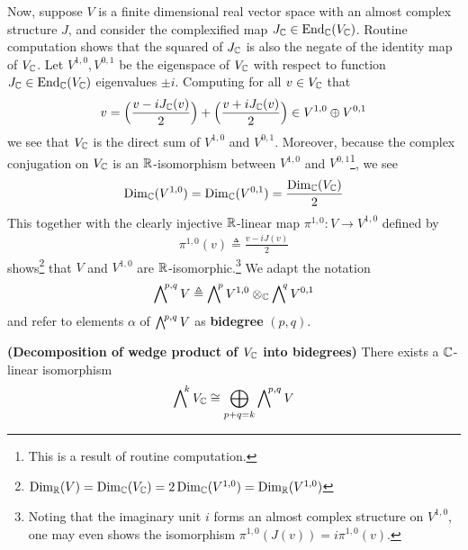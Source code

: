 \documentclass{report}
\begin{document}
Now, suppose $V$ is a finite dimensional real vector space with an almost complex structure  $J$, and consider the complexified map $J_{\mathbb{C}}\in \operatorname{End}_{\mathbb{C}}(V_{\mathbb{C}})$. Routine computation shows that the squared of $J_{\mathbb{C}}$ is also the negate of the identity map of  $V_{\mathbb{C}}$. Let $V^{1,0},V^{0,1}$ be the eigenspace of $V_{\mathbb{C}}$ with respect to function $J_{\mathbb{C}} \in \operatorname{End}_{\mathbb{C}}(V_{\mathbb{C}})$ eigenvalues $\pm i$. Computing for all $v\in V_{\mathbb{C}}$ that 
\begin{align*}
v=\Big( \frac{v- i J_{\mathbb{C}}(v)}{2} \Big)+ \Big( \frac{v+i J_{\mathbb{C}}(v)}{2} \Big) \in V^{1,0} \oplus  V^{0,1}
\end{align*}
we see that $V_{\mathbb{C}}$ is the direct sum of $V^{1,0}$ and $V^{0,1}$. Moreover, because the complex conjugation on $V_{\mathbb{C}}$ is an  $\mathbb{R}$-isomorphism between  $V^{1,0}$ and $V^{0,1}$\footnote{This is a result of routine computation.}, we see 
\begin{align*}
\operatorname{Dim}_{\mathbb{C}} (V^{1,0})= \operatorname{Dim}_{\mathbb{C}} (V^{0,1})=\frac{\operatorname{Dim}_{\mathbb{C}} (V_{\mathbb{C}})}{2}
\end{align*}
This together with the clearly injective $\mathbb{R}$-linear map  $\pi ^{1,0}:V\rightarrow V^{1,0}$ defined by 
\begin{align*}
\pi ^{1,0} (v)\triangleq \frac{v-i J(v)}{2}
\end{align*}
shows\footnote{$\operatorname{Dim}_{\mathbb{R}}(V)=\operatorname{Dim}_{\mathbb{C}} (V_{\mathbb{C}})=2\operatorname{Dim}_{\mathbb{C}} (V^{1,0})=\operatorname{Dim}_{\mathbb{R}} (V^{1,0})$} that $V$ and  $V^{1,0}$ are $\mathbb{R}$-isomorphic.\footnote{Noting that the imaginary unit $i$ forms an almost complex structure on $V^{1,0}$, one may even shows the isomorphism $\pi ^{1,0}(J(v))=i \pi ^{1,0}(v)$.} We adapt the notation 
\begin{align*}
\extp^{p,q}V\triangleq \extp^{p}V^{1,0}\otimes _\C \extp^{q}V^{0,1}
\end{align*}
and refer to elements $\alpha $ of $\extp^{p,q}V$ as \textbf{bidegree} $(p,q)$. 
\begin{theorem}
\textbf{(Decomposition of wedge product of $V_{\mathbb{C}}$ into bidegrees)} There exists a $\mathbb{C}$-linear isomorphism 
 \begin{align*}
\extp^k V_\C \cong \bigoplus _{p+q=k}\extp^{p,q}V
\end{align*}
\end{theorem}
\end{document}
